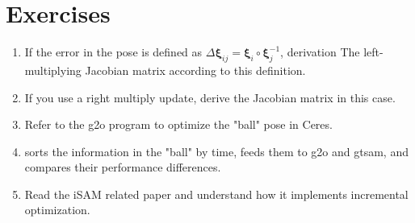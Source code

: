 \section*{ Exercises}
    \begin{enumerate}
        \item If the error in the pose is defined as $\Delta \bm{\xi}_{ij} = \bm{\xi}_i \circ \bm{\xi}_j^{-1}$, derivation The left-multiplying Jacobian matrix according to this definition.
        \item If you use a right multiply update, derive the Jacobian matrix in this case.
        \item Refer to the g2o program to optimize the "ball" pose in Ceres.
        \item sorts the information in the "ball" by time, feeds them to g2o and gtsam, and compares their performance differences.
        \item[\optional] Read the iSAM related paper and understand how it implements incremental optimization.
    \end{enumerate}
